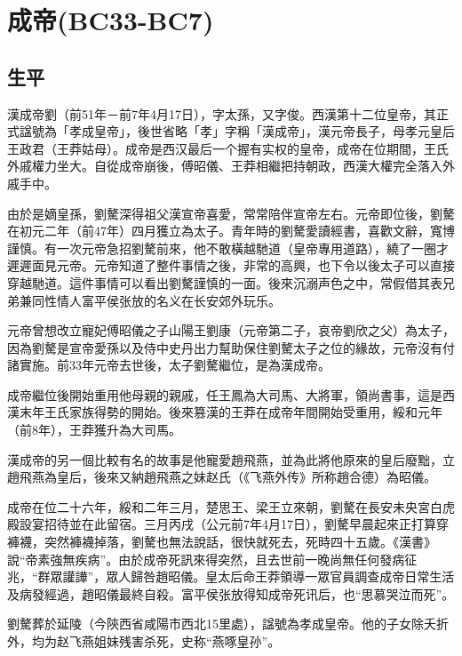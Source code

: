 
\section{成帝\tiny(BC33-BC7)}

\subsection{生平}

漢成帝劉（前51年－前7年4月17日），字太孫，又字俊。西漢第十二位皇帝，其正式諡號為「孝成皇帝」，後世省略「孝」字稱「漢成帝」，漢元帝長子，母孝元皇后王政君（王莽姑母）。成帝是西汉最后一个握有实权的皇帝，成帝在位期間，王氏外戚權力坐大。自從成帝崩後，傅昭儀、王莽相繼把持朝政，西漢大權完全落入外戚手中。

由於是嫡皇孫，劉驁深得祖父漢宣帝喜愛，常常陪伴宣帝左右。元帝即位後，劉驁在初元二年（前47年）四月獲立為太子。青年時的劉驁愛讀經書，喜歡文辭，寬博謹慎。有一次元帝急招劉驁前來，他不敢橫越馳道（皇帝專用道路），繞了一圈才遲遲面見元帝。元帝知道了整件事情之後，非常的高興，也下令以後太子可以直接穿越馳道。這件事情可以看出劉驁謹慎的一面。後來沉溺声色之中，常假借其表兄弟兼同性情人富平侯张放的名义在长安郊外玩乐。

元帝曾想改立寵妃傅昭儀之子山陽王劉康（元帝第二子，哀帝劉欣之父）為太子，因為劉驁是宣帝愛孫以及侍中史丹出力幫助保住劉驁太子之位的緣故，元帝沒有付諸實施。前33年元帝去世後，太子劉驁繼位，是為漢成帝。

成帝繼位後開始重用他母親的親戚，任王鳳為大司馬、大將軍，領尚書事，這是西漢末年王氏家族得勢的開始。後來篡漢的王莽在成帝年間開始受重用，綏和元年（前8年），王莽獲升為大司馬。

漢成帝的另一個比較有名的故事是他寵愛趙飛燕，並為此將他原來的皇后廢黜，立趙飛燕為皇后，後來又納趙飛燕之妹赵氏（《飞燕外传》所称趙合德）為昭儀。

成帝在位二十六年，綏和二年三月，楚思王、梁王立來朝，劉驁在長安未央宮白虎殿設宴招待並在此留宿。三月丙戌（公元前7年4月17日），劉驁早晨起來正打算穿褲襪，突然褲襪掉落，劉驁也無法說話，很快就死去，死時四十五歲。《漢書》說“帝素強無疾病”。由於成帝死訊來得突然，且去世前一晚尚無任何發病征兆，“群眾讙譁”，眾人歸咎趙昭儀。皇太后命王莽領導一眾官員調查成帝日常生活及病發經過，趙昭儀最終自殺。富平侯张放得知成帝死讯后，也“思慕哭泣而死”。

劉驁葬於延陵（今陝西省咸陽市西北15里處），諡號為孝成皇帝。他的子女除夭折外，均为赵飞燕姐妹残害杀死，史称“燕啄皇孙”。

